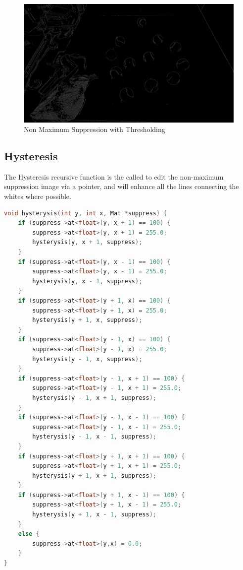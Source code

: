 \documentclass[a4paper, 10pt]{article}
\begin{document}
\begin{figure}[H]
  \includegraphics[width=\linewidth]{images/MaxSuppression}
  \caption{Non Maximum Suppression with Thresholding}
  \label{fig:Non Maximum Suppression with Thresholding}
\end{figure}


\clearpage
\subsection{Hysteresis}

The Hysteresis recursive function is the called to edit the non-maximum suppression image via a pointer, and will enhance all the lines connecting the whites where possible.

\begin{lstlisting}[language = C++]
void hysterysis(int y, int x, Mat *suppress) {
	if (suppress->at<float>(y, x + 1) == 100) {
		suppress->at<float>(y, x + 1) = 255.0;
		hysterysis(y, x + 1, suppress);
	}
	if (suppress->at<float>(y, x - 1) == 100) {
		suppress->at<float>(y, x - 1) = 255.0;
		hysterysis(y, x - 1, suppress);
	}
	if (suppress->at<float>(y + 1, x) == 100) {
		suppress->at<float>(y + 1, x) = 255.0;
		hysterysis(y + 1, x, suppress);
	}
	if (suppress->at<float>(y - 1, x) == 100) {
		suppress->at<float>(y - 1, x) = 255.0;
		hysterysis(y - 1, x, suppress);
	}
	if (suppress->at<float>(y - 1, x + 1) == 100) {
		suppress->at<float>(y - 1, x + 1) = 255.0;
		hysterysis(y - 1, x + 1, suppress);
	}
	if (suppress->at<float>(y - 1, x - 1) == 100) {
		suppress->at<float>(y - 1, x - 1) = 255.0;
		hysterysis(y - 1, x - 1, suppress);
	}
	if (suppress->at<float>(y + 1, x + 1) == 100) {
		suppress->at<float>(y + 1, x + 1) = 255.0;
		hysterysis(y + 1, x + 1, suppress);
	}
	if (suppress->at<float>(y + 1, x - 1) == 100) {
		suppress->at<float>(y + 1, x - 1) = 255.0;
		hysterysis(y + 1, x - 1, suppress);
	}
	else { 
		suppress->at<float>(y,x) = 0.0;
	}
}
\end{lstlisting}
\end{document}

